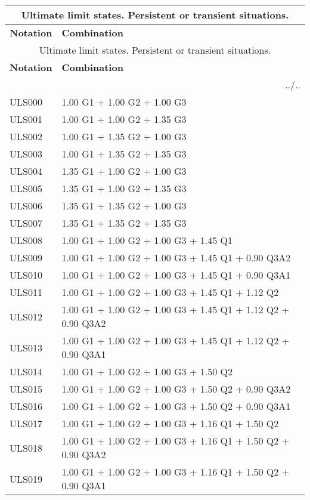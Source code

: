\begin{center}
\begin{small}
\begin{longtable}{|l|p{10cm}|}
\hline
\multicolumn{2}{|c|}{Ultimate limit states. Persistent or transient situations.}\\
\hline
\textbf{Notation} & \textbf{Combination} \\
\hline
\endfirsthead
\hline
\multicolumn{2}{|c|}{Ultimate limit states. Persistent or transient situations.}\\
\hline
\textbf{Notation} & \textbf{Combination} \\
\hline
\endhead
\hline \multicolumn{2}{|r|}{{../..}} \\ \hline
\endfoot
\hline
\endlastfoot
ULS000 & 1.00 G1 + 1.00 G2 + 1.00 G3\\
ULS001 & 1.00 G1 + 1.00 G2 + 1.35 G3\\
ULS002 & 1.00 G1 + 1.35 G2 + 1.00 G3\\
ULS003 & 1.00 G1 + 1.35 G2 + 1.35 G3\\
ULS004 & 1.35 G1 + 1.00 G2 + 1.00 G3\\
ULS005 & 1.35 G1 + 1.00 G2 + 1.35 G3\\
ULS006 & 1.35 G1 + 1.35 G2 + 1.00 G3\\
ULS007 & 1.35 G1 + 1.35 G2 + 1.35 G3\\
ULS008 & 1.00 G1 + 1.00 G2 + 1.00 G3 + 1.45 Q1\\
ULS009 & 1.00 G1 + 1.00 G2 + 1.00 G3 + 1.45 Q1 + 0.90 Q3A2\\
ULS010 & 1.00 G1 + 1.00 G2 + 1.00 G3 + 1.45 Q1 + 0.90 Q3A1\\
ULS011 & 1.00 G1 + 1.00 G2 + 1.00 G3 + 1.45 Q1 + 1.12 Q2\\
ULS012 & 1.00 G1 + 1.00 G2 + 1.00 G3 + 1.45 Q1 + 1.12 Q2 + 0.90 Q3A2\\
ULS013 & 1.00 G1 + 1.00 G2 + 1.00 G3 + 1.45 Q1 + 1.12 Q2 + 0.90 Q3A1\\
ULS014 & 1.00 G1 + 1.00 G2 + 1.00 G3 + 1.50 Q2\\
ULS015 & 1.00 G1 + 1.00 G2 + 1.00 G3 + 1.50 Q2 + 0.90 Q3A2\\
ULS016 & 1.00 G1 + 1.00 G2 + 1.00 G3 + 1.50 Q2 + 0.90 Q3A1\\
ULS017 & 1.00 G1 + 1.00 G2 + 1.00 G3 + 1.16 Q1 + 1.50 Q2\\
ULS018 & 1.00 G1 + 1.00 G2 + 1.00 G3 + 1.16 Q1 + 1.50 Q2 + 0.90 Q3A2\\
ULS019 & 1.00 G1 + 1.00 G2 + 1.00 G3 + 1.16 Q1 + 1.50 Q2 + 0.90 Q3A1\\

\end{longtable}
\end{small}
\end{center}
